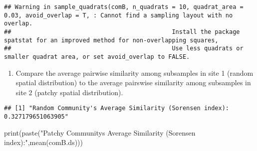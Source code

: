 \documentclass[
]{article}
\newenvironment{Shaded}{\begin{snugshade}}{\end{snugshade}}
\newcommand{\AttributeTok}[1]{\textcolor[rgb]{0.77,0.63,0.00}{#1}}
\newcommand{\ConstantTok}[1]{\textcolor[rgb]{0.00,0.00,0.00}{#1}}
\newcommand{\FunctionTok}[1]{\textcolor[rgb]{0.00,0.00,0.00}{#1}}
\newcommand{\NormalTok}[1]{#1}
\newcommand{\OtherTok}[1]{\textcolor[rgb]{0.56,0.35,0.01}{#1}}
\newcommand{\SpecialCharTok}[1]{\textcolor[rgb]{0.00,0.00,0.00}{#1}}
\newcommand{\StringTok}[1]{\textcolor[rgb]{0.31,0.60,0.02}{#1}}
\providecommand{\tightlist}{%
  \setlength{\itemsep}{0pt}\setlength{\parskip}{0pt}}
\begin{document}
\begin{verbatim}
## Warning in sample_quadrats(comB, n_quadrats = 10, quadrat_area = 0.03, avoid_overlap = T, : Cannot find a sampling layout with no overlap.
##                                             Install the package spatstat for an improved method for non-overlapping squares,
##                                             Use less quadrats or smaller quadrat area, or set avoid_overlap to FALSE.
\end{verbatim}

\begin{enumerate}
\def\labelenumi{\arabic{enumi})}
\tightlist
\item
  Compare the average pairwise similarity among subsamples in site 1
  (random spatial distribution) to the average pairswise similarity
  among subsamples in site 2 (patchy spatial distribution).
\end{enumerate}

\begin{Shaded}
\end{Shaded}

\begin{verbatim}
## [1] "Random Community's Average Similarity (Sorensen index): 0.327179651063905"
\end{verbatim}

\begin{Shaded}
\begin{Highlighting}[]
\FunctionTok{print}\NormalTok{(}\FunctionTok{paste}\NormalTok{(}\StringTok{"Patchy Community\textquotesingle{}s Average Similarity (Sorensen index):"}\NormalTok{,}\FunctionTok{mean}\NormalTok{(comB.ds)))}
\end{Highlighting}
\end{Shaded}
\end{document}
